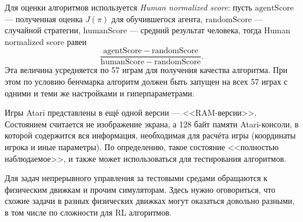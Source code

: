 \begin{example}
Для оценки алгоритмов используется \emph{Human normalized score}: пусть $\mathrm{agentScore}$ --- полученная оценка $J(\pi)$ для обучившегося агента, $\mathrm{randomScore}$ --- случайной стратегии, $\mathrm{humanScore}$ --- средний результат человека, тогда Human normalized score равен
$$\frac{\mathrm{agentScore} - \mathrm{randomScore}}{\mathrm{humanScore} - \mathrm{randomScore}}.$$
Эта величина усредняется по 57 играм для получения качества алгоритма. При этом по условию бенчмарка алгоритм должен быть запущен на всех 57 играх с одними и теми же настройками и гиперпараметрами.
\end{example}

\begin{example}
Игры Atari представлены в ещё одной версии --- <<RAM-версии>>. Состоянием считается не изображение экрана, а 128 байт памяти Atari-консоли, в которой содержится вся информация, необходимая для расчёта игры (координаты игрока и иные параметры). По определению, такое состояние <<полностью наблюдаемое>>, и также может использоваться для тестирования алгоритмов.
\end{example}

Для задач непрерывного управления за тестовыми средами обращаются к физическим движкам и прочим симуляторам. Здесь нужно оговориться, что схожие задачи в разных физических движках могут оказаться довольно разными, в том числе по сложности для RL алгоритмов.

